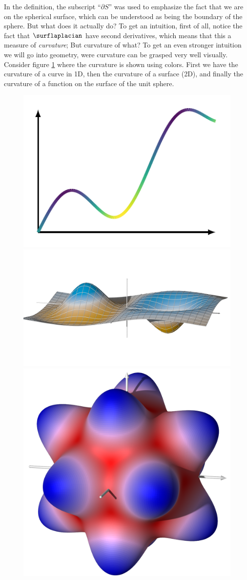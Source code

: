 In the definition, the subscript ``$\partial S$'' was used to emphasize the
fact that we are on the spherical surface, which can be understood as being the
boundary of the sphere. But what does it actually do? To get an intuition,
first of all, notice the fact that $\surflaplacian$ have second derivatives,
which means that this a measure of \emph{curvature}; But curvature of what? To
get an even stronger intuition we will go into geometry, were curvature can be
grasped very well visually. Consider figure \ref{kugel:fig:curvature} where the
curvature is shown using colors. First we have the curvature of a curve in 1D,
then the curvature of a surface (2D), and finally the curvature of a function on
the surface of the unit sphere.

\begin{figure}
  \centering
  \includegraphics[width=.3\linewidth]{papers/kugel/figures/tikz/curvature-1d}
  \hskip 5mm
  \includegraphics[width=.3\linewidth]{papers/kugel/figures/povray/curvature}
  \hskip 5mm
  \includegraphics[width=.3\linewidth]{papers/kugel/figures/povray/spherecurve}
  \caption{
    \label{kugel:fig:curvature}
  }
\end{figure}

